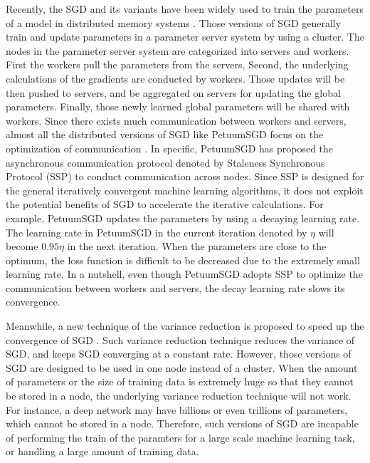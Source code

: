 \documentclass[preprint,review,11pt,a4paper]{elsarticle}
\begin{document}
Recently, the SGD and its variants have been widely used to train the parameters of a model in distributed memory systems \cite{Dean:2012wx, Li:2014tt, Xing:2015ib}. Those versions of SGD generally train and update parameters in a parameter server system by using a cluster. The nodes in the parameter server system are categorized into servers and workers. First the workers pull the parameters from the servers, Second, the underlying calculations of the gradients are conducted by workers. Those updates will be then pushed to servers, and be aggregated on servers for updating the global parameters. Finally, those newly learned global parameters will be shared with workers. Since there exists much communication between workers and servers, almost all the distributed versions of SGD like PetuumSGD focus on the optimization of communication \cite{Xing:2015ib}.  In specific, PetuumSGD has proposed the asynchronous communication protocol denoted by Staleness Synchronous Protocol (SSP) to conduct communication across nodes. Since SSP is designed for the general iteratively convergent machine learning algorithms, it does not exploit the potential benefits of SGD to accelerate the iterative calculations. For example, PetuumSGD updates the parameters by using a decaying learning rate. The learning rate in PetuumSGD in the current iteration denoted by $\eta$ will become $0.95\eta$ in the next iteration. When the parameters are close to the optimum, the loss function is difficult to be decreased due to the extremely small learning rate. In a nutshell,   even though PetuumSGD adopts SSP  to optimize the communication between workers and servers, the decay learning rate slows its convergence.

Meanwhile, a new technique of the variance reduction is proposed to speed up the convergence of SGD \cite{Johnson:9MAvkbgy, Zhao:SZfxEHHg, Reddi:2015vj}. Such variance reduction technique reduces the variance of SGD, and keeps SGD converging at a constant rate.   However, those versions of SGD are designed to be used in one node instead of a cluster. When the amount of parameters or the size of training data is extremely huge so that they cannot be stored in a node, the underlying variance reduction technique will not work. For instance, a deep network may have billions or even trillions of parameters, which cannot be stored in a node. Therefore, such versions of SGD are incapable of performing the train of the paramters for a large scale machine learning task, or handling a large amount of training data.
\end{document}
